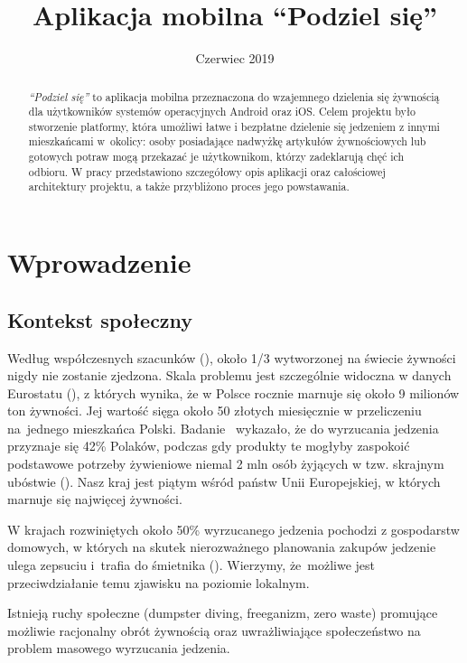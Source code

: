 \documentclass[licencjacka]{pracamgr}
\title{Aplikacja mobilna ``Podziel się''}
\date{Czerwiec 2019}
\begin{document}
\maketitle

\begin{abstract}
\textit{``Podziel się''} to aplikacja mobilna przeznaczona do wzajemnego dzielenia się żywnością dla użytkowników systemów operacyjnych Android oraz iOS\@. Celem projektu było stworzenie platformy, która umożliwi łatwe i bezpłatne dzielenie się jedzeniem z innymi mieszkańcami w~okolicy: osoby posiadające nadwyżkę artykułów żywnościowych lub gotowych potraw mogą przekazać je użytkownikom, którzy zadeklarują chęć ich odbioru. W pracy przedstawiono szczegółowy opis aplikacji oraz całościowej architektury projektu, a także przybliżono proces jego powstawania.
\end{abstract}

\tableofcontents

\chapter*{Wprowadzenie}
\section*{Kontekst społeczny}
Według współczesnych szacunków (\cite{fao}), około 1/3 wytworzonej na świecie żywności nigdy nie zostanie zjedzona. Skala problemu jest szczególnie widoczna w danych Eurostatu (\cite{eurostat}), z których wynika, że w Polsce rocznie marnuje się około 9 milionów ton żywności. Jej wartość sięga około 50 złotych miesięcznie w przeliczeniu na~jednego mieszkańca Polski. Badanie~\cite{millward-brown} wykazało, że do wyrzucania jedzenia przyznaje się 42\% Polaków, podczas gdy produkty te mogłyby zaspokoić podstawowe potrzeby żywieniowe niemal 2 mln osób żyjących w tzw. skrajnym ubóstwie (\cite{gus}). Nasz kraj jest piątym wśród państw Unii Europejskiej, w których marnuje się najwięcej żywności.

W krajach rozwiniętych około 50\% wyrzucanego jedzenia pochodzi z gospodarstw domowych, w których na skutek nierozważnego planowania zakupów jedzenie ulega zepsuciu i~trafia do śmietnika (\cite{polityka}). Wierzymy, że~możliwe jest przeciwdziałanie temu zjawisku na poziomie lokalnym.

Istnieją ruchy społeczne (dumpster diving, freeganizm, zero waste) promujące możliwie racjonalny obrót żywnością oraz uwrażliwiające społeczeństwo na problem masowego wyrzucania jedzenia.
\end{document}
